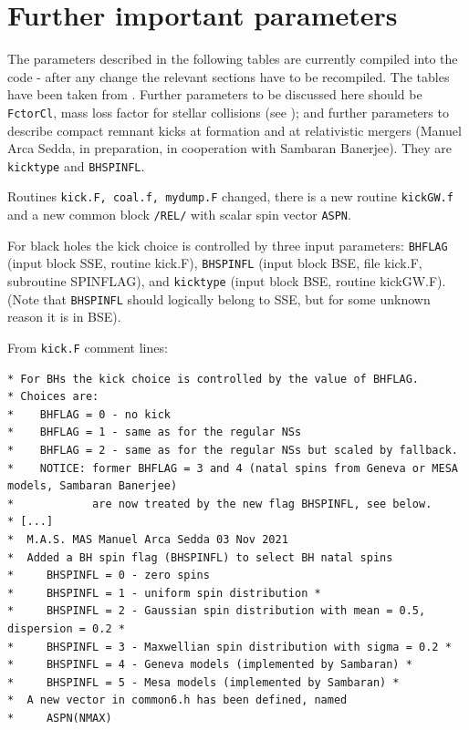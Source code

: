 \section{Further important parameters}
\label{ch:parameters}

The parameters described in the following tables are currently compiled into the code - after any change the relevant sections have to be recompiled. The tables have been taken from \cite{Kamlah2022}. Further parameters to be discussed here should be \texttt{FctorCl}, mass loss factor for stellar collisions (see \cite{Rizzuto2021}); and further parameters to describe compact remnant kicks at formation and at relativistic mergers (Manuel Arca Sedda, in preparation, in cooperation with Sambaran Banerjee). They are \texttt{kicktype} and \texttt{BHSPINFL}.

Routines \texttt{kick.F, coal.f, mydump.F} changed, there is a new routine \texttt{kickGW.f} and a new common block \texttt{/REL/} with scalar spin vector \texttt{ASPN}.

For black holes the kick choice is controlled by three input parameters: 
\texttt{BHFLAG} (input block SSE, routine kick.F), \texttt{BHSPINFL} (input block BSE, file kick.F, subroutine SPINFLAG), and \texttt{kicktype} (input block BSE, routine kickGW.F). (Note that  \texttt{BHSPINFL} should logically belong to SSE, but for some unknown reason it is in BSE).

From \texttt{kick.F} comment lines:
\begin{lstlisting}[breaklines]
* For BHs the kick choice is controlled by the value of BHFLAG.
* Choices are:
*    BHFLAG = 0 - no kick
*    BHFLAG = 1 - same as for the regular NSs
*    BHFLAG = 2 - same as for the regular NSs but scaled by fallback.
*    NOTICE: former BHFLAG = 3 and 4 (natal spins from Geneva or MESA models, Sambaran Banerjee)
*            are now treated by the new flag BHSPINFL, see below.
* [...]
*  M.A.S. MAS Manuel Arca Sedda 03 Nov 2021
*  Added a BH spin flag (BHSPINFL) to select BH natal spins
*     BHSPINFL = 0 - zero spins
*     BHSPINFL = 1 - uniform spin distribution *
*     BHSPINFL = 2 - Gaussian spin distribution with mean = 0.5, dispersion = 0.2 *
*     BHSPINFL = 3 - Maxwellian spin distribution with sigma = 0.2 *
*     BHSPINFL = 4 - Geneva models (implemented by Sambaran) *
*     BHSPINFL = 5 - Mesa models (implemented by Sambaran) *
*  A new vector in common6.h has been defined, named
*     ASPN(NMAX)
\end{lstlisting}

